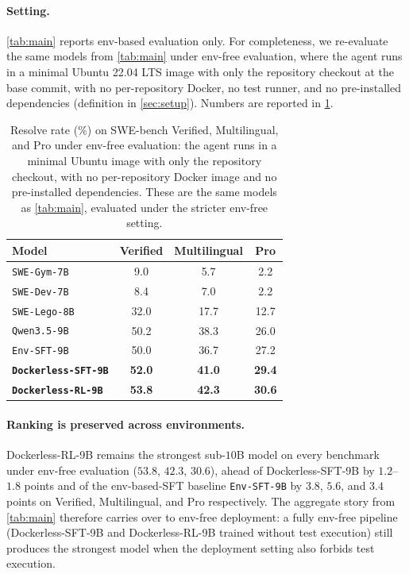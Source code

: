 \documentclass[]{arxiv_template}
\newcommand{\approach}{Dockerless\xspace}
\begin{document}
\paragraph{Setting.}
\cref{tab:main} reports env-based evaluation only.
For completeness, we re-evaluate the same models from \cref{tab:main} under env-free evaluation, where the agent runs in a minimal Ubuntu 22.04 LTS image with only the repository checkout at the base commit, with no per-repository Docker, no test runner, and no pre-installed dependencies (definition in \cref{sec:setup}).
Numbers are reported in \cref{tab:main-wo-env}.
\begin{table}[t]
\centering
\small
\begin{tabular}{lccc}
\toprule
\textbf{Model}
& \textbf{Verified}
& \textbf{Multilingual}
& \textbf{Pro} \\
\midrule
\texttt{SWE-Gym-7B}                & 9.0  & 5.7  & 2.2  \\
\texttt{SWE-Dev-7B}                & 8.4  & 7.0  & 2.2  \\
\texttt{SWE-Lego-8B}               & 32.0 & 17.7 & 12.7 \\
\texttt{Qwen3.5-9B}                & 50.2 & 38.3 & 26.0 \\
\midrule
\texttt{Env-SFT-9B}                & 50.0 & 36.7 & 27.2 \\
\rowcolor{black!4}
\textbf{\texttt{\approach-SFT-9B}} & \textbf{52.0} & \textbf{41.0} & \textbf{29.4} \\
\rowcolor{black!4}
\textbf{\texttt{\approach-RL-9B}}  & \textbf{53.8} & \textbf{42.3} & \textbf{30.6} \\
\bottomrule
\end{tabular}%
\caption{
Resolve rate (\%) on SWE-bench Verified, Multilingual, and Pro under env-free evaluation: the agent runs in a minimal Ubuntu image with only the repository checkout, with no per-repository Docker image and no pre-installed dependencies.
These are the same models as \cref{tab:main}, evaluated under the stricter env-free setting.
}
\label{tab:main-wo-env}
\end{table}

\paragraph{Ranking is preserved across environments.}
\approach-RL-9B remains the strongest sub-$10$B model on every benchmark under env-free evaluation ($53.8$, $42.3$, $30.6$), ahead of \approach-SFT-9B by $1.2$--$1.8$ points and of the env-based-SFT baseline \texttt{Env-SFT-9B} by $3.8$, $5.6$, and $3.4$ points on Verified, Multilingual, and Pro respectively.
The aggregate story from \cref{tab:main} therefore carries over to env-free deployment: a fully env-free pipeline (\approach-SFT-9B and \approach-RL-9B trained without test execution) still produces the strongest model when the deployment setting also forbids test execution.
\end{document}
